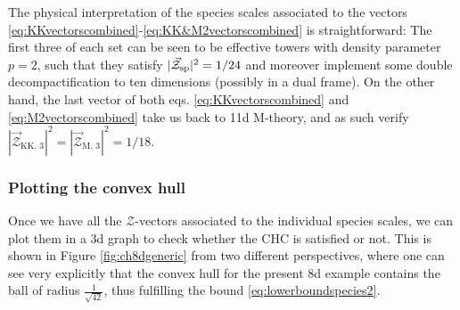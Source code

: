 %
The physical interpretation of the species scales associated to the vectors \eqref{eq:KKvectorscombined}-\eqref{eq:KK&M2vectorscombined} is straightforward: The first three of each set can be seen to be effective towers with density parameter $p=2$, such that they satisfy $|\vec{\mathcal{Z}}_{\rm sp}|^2=1/24$ and moreover implement some double decompactification to ten dimensions (possibly in a dual frame). On the other hand, the last vector of both eqs. \eqref{eq:KKvectorscombined} and \eqref{eq:M2vectorscombined} take us back to 11d M-theory, and as such verify $|\vec{\mathcal{Z}}_{\text{KK},\,3}|^2=|\vec{\mathcal{Z}}_{\text{M},\,3}|^2=1/18$. %

\subsubsection*{Plotting the convex hull}

Once we have all the $\mathcal{Z}$-vectors associated to the individual species scales, we can plot them in a 3d graph to check whether the CHC is satisfied or not. This is shown in Figure \ref{fig:ch8dgeneric} from two different perspectives, where one can see very explicitly that the convex hull for the present 8d example contains the ball of radius $\frac{1}{\sqrt{42}}$, thus fulfilling the bound \eqref{eq:lowerboundspecies2}. 

